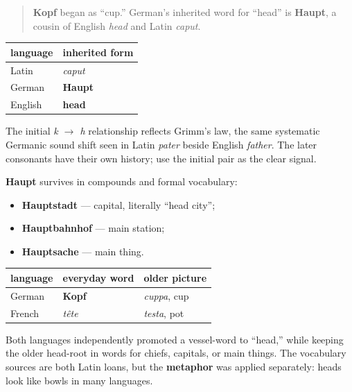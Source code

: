 \label{lesson:GE-C17-kopf-haupt}



\begin{quote}
\textbf{Kopf} began as “cup.” German’s inherited word for “head” is \textbf{Haupt}, a cousin of English \emph{head} and Latin \emph{caput}.
\end{quote}

\begin{cousinweb}
\noindent
\begin{tabularx}{\linewidth}{@{}>{\raggedright\arraybackslash}X>{\raggedright\arraybackslash}X@{}}
\toprule
\textbf{language} & \textbf{inherited form} \\
\midrule
Latin & \emph{caput} \\
German & \textbf{Haupt} \\
English & \textbf{head} \\
\bottomrule
\end{tabularx}

The initial \emph{k $\to$ h} relationship reflects Grimm’s law, the same systematic Germanic sound shift seen in Latin \emph{pater} beside English \emph{father}. The later consonants have their own history; use the initial pair as the clear signal.

\textbf{Haupt} survives in compounds and formal vocabulary:

\begin{itemize}
\raggedright
  \item \textbf{Hauptstadt} — capital, literally “head city”;
  \item \textbf{Hauptbahnhof} — main station;
  \item \textbf{Hauptsache} — main thing.
\end{itemize}
\end{cousinweb}

\begin{culture}
\noindent
\begin{tabularx}{\linewidth}{@{}>{\raggedright\arraybackslash}X>{\raggedright\arraybackslash}X>{\raggedright\arraybackslash}X@{}}
\toprule
\textbf{language} & \textbf{everyday word} & \textbf{older picture} \\
\midrule
German & \textbf{Kopf} & \emph{cuppa}, cup \\
French & \emph{tête} & \emph{testa}, pot \\
\bottomrule
\end{tabularx}

Both languages independently promoted a vessel-word to “head,” while keeping the older head-root in words for chiefs, capitals, or main things. The vocabulary sources are both Latin loans, but the \textbf{metaphor} was applied separately: heads look like bowls in many languages.
\end{culture}

